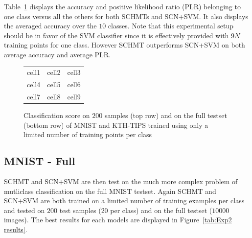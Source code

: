\documentclass{article}
\begin{document}
		Table~\ref{tab:Exp1 results} displays the accuracy and positive likelihood ratio (PLR) belonging to one class versus all the others for both SCHMTs and SCN+SVM. It also displays the averaged accuracy over the $10$ classes. Note that this experimental setup should be in favor of the SVM classifier since it is effectively provided with $9N$ training points for one class. However SCHMT outperforms SCN+SVM on both average accuracy and average PLR.
		
		\begin{figure}
      \begin{center}
        \begin{tabular}{ |c|c|c| } 
          \hline
          cell1 & cell2 & cell3 \\ 
          cell4 & cell5 & cell6 \\ 
          cell7 & cell8 & cell9 \\ 
          \hline
        \end{tabular}
      \end{center}
      \caption{Classification score on $200$ samples (top row) and on the full testset (bottom row) of MNIST and KTH-TIPS trained using only a limited number of training points per class}
      \label{tab:Exp1 results}
      \vspace{-15pt}
    \end{figure}

  \subsection{MNIST - Full}
    \label{subsec:Exps/MNIST - Full}
    \vspace{-5pt}
		SCHMT and SCN+SVM are then test on the much more complex problem of mutliclass classification on the full MNIST testset. Again SCHMT and SCN+SVM are both trained on a limited number of training examples per class and tested on $200$ test samples ($20$ per class) and on the full testset ($10000$ images). The best results for each models are displayed in Figure~\ref{tab:Exp2 results}.
\end{document}
